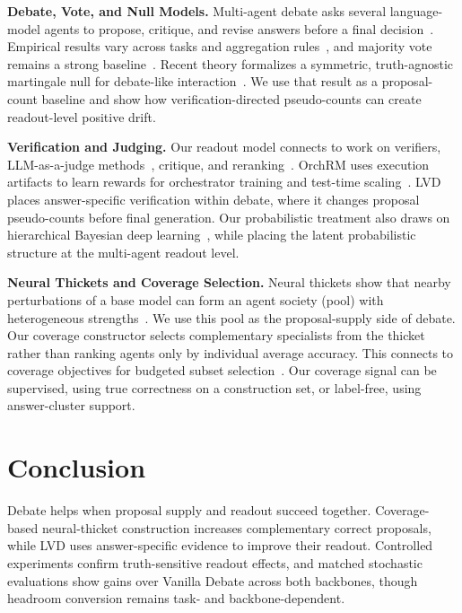 \textbf{Debate, Vote, and Null Models.}
Multi-agent debate asks several language-model agents to propose, critique, and
revise answers before a final decision~\citep{du2024improving, chanchateval, xiong2023examining, chen2024reconcile}. Empirical
results vary across tasks and aggregation rules~\citep{smit2024should,wang2024rethinking,estornell2024multi,zhang2025if}, and majority vote remains a
strong baseline~\citep{wang2023selfconsistency,kaesberg-etal-2025-voting}. Recent theory
formalizes a symmetric, truth-agnostic martingale null for debate-like
interaction~\citep{choi2026debate}. We use that result as a proposal-count
baseline and show how verification-directed pseudo-counts can create
readout-level positive drift.

\textbf{Verification and Judging.}
Our readout model connects to work on verifiers, LLM-as-a-judge methods~\citep{tan2025judgebenchbenchmarkevaluatingllmbased, zhou2025evaluatingjudgesevaluatorsjetts},
critique, and reranking~\citep{cobbe2021trainingverifierssolvemath, lightman2023letsverifystepstep, li-etal-2023-making, zheng2023judgingllmasajudgemtbenchchatbot, NEURIPS2023_91edff07}.
OrchRM uses execution artifacts to learn rewards for orchestrator training and
test-time scaling~\citep{tsang2026rewardmodelingmultiagentorchestration}.
LVD places answer-specific verification within debate, where it changes
proposal pseudo-counts before final generation.
Our probabilistic treatment also draws on hierarchical Bayesian deep
learning~\citep{BDL,BDLSurvey}, while placing the latent probabilistic
structure at the multi-agent readout level.

\textbf{Neural Thickets and Coverage Selection.}
Neural thickets show that nearby perturbations of a base model can form an
agent society (pool) with heterogeneous strengths~\citep{gan2026neuralthicketsdiversetask,qiu2026evolutionstrategiesscalellm}. We use
this pool as the proposal-supply side of debate. Our coverage constructor
selects complementary specialists from the thicket rather than ranking agents
only by individual average accuracy. This connects to coverage objectives for
budgeted subset selection~\citep{nemhauser1978analysis}.
Our coverage signal can be supervised, using true correctness on a construction
set, or label-free, using answer-cluster support.

\section{Conclusion}

Debate helps when proposal supply and readout succeed together. Coverage-based neural-thicket construction increases complementary correct proposals, while LVD uses answer-specific evidence to improve their readout. Controlled experiments confirm truth-sensitive readout effects, and matched stochastic evaluations show gains over Vanilla Debate across both backbones, though headroom conversion remains task- and backbone-dependent.

